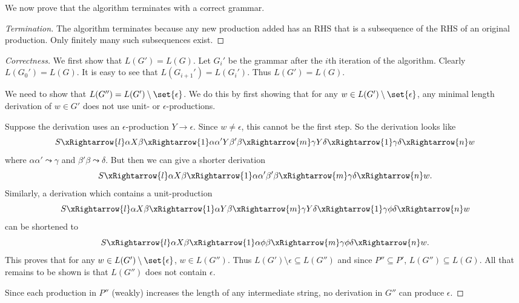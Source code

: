 We now prove that the algorithm terminates with a correct grammar.
\begin{proof}[Termination]
    The algorithm terminates because any new production added has an RHS
    that is a subsequence of the RHS of an original production.
    Only finitely many such subsequences exist.
\end{proof}
\begin{proof}[Correctness]
    We first show that $L(G') = L(G)$.
    Let $G_i'$ be the grammar after the $i$th iteration of the algorithm.
    Clearly $L(G_0') = L(G)$.
    It is easy to see that $L(G_{i+1}') = L(G_i')$.
    Thus $L(G') = L(G)$.

    We need to show that $L(G'') = L(G') \setminus \set{\epsilon}$.
    We do this by first showing that for any
    $w \in L(G') \setminus \set{\epsilon}$,
    any minimal length derivation of $w \in G'$ does not use unit- or
    $\epsilon$-productions.


    Suppose the derivation uses an $\epsilon$-production $Y \to \epsilon$.
    Since $w \ne \epsilon$, this cannot be the first step.
    So the derivation looks like \[
        S \xRightarrow{l} \alpha X \beta \xRightarrow{1}
        \alpha \alpha' Y \beta' \beta \xRightarrow{m}
        \gamma Y \delta \xRightarrow{1} \gamma \delta \xRightarrow{n} w
    \] where $\alpha \alpha' \leadsto \gamma$ and
    $\beta' \beta \leadsto \delta$.
    But then we can give a shorter derivation \[
        S \xRightarrow{l} \alpha X \beta \xRightarrow{1} \alpha \alpha'
        \beta' \beta \xRightarrow{m} \gamma \delta \xRightarrow{n} w.
    \] Similarly, a derivation which contains a unit-production \[
        S \xRightarrow{l} \alpha X \beta \xRightarrow{1} \alpha Y \beta
        \xRightarrow{m} \gamma Y \delta \xRightarrow{1} \gamma \phi \delta
        \xRightarrow{n} w
    \] can be shortened to \[
        S \xRightarrow{l} \alpha X \beta \xRightarrow{1} \alpha \phi \beta
        \xRightarrow{m} \gamma \phi \delta \xRightarrow{n} w.
    \]
    This proves that for any $w \in L(G') \setminus \set{\epsilon}$,
    $w \in L(G'')$.
    Thus $L(G') \setminus \epsilon \subseteq L(G'')$ and since
    $P'' \subseteq P'$, $L(G'') \subseteq L(G)$.
    All that remains to be shown is that $L(G'')$ does not contain
    $\epsilon$.

    Since each production in $P''$ (weakly) increases the length of any
    intermediate string, no derivation in $G''$ can produce $\epsilon$.
\end{proof}
